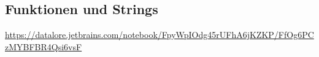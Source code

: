 \documentclass[]{scrartcl}
\begin{document}
\subsection*{Funktionen und Strings}
\url{https://datalore.jetbrains.com/notebook/FpyWpIOdg45rUFhA6jKZKP/FfOg6PCzMYBFBR4Qsi6vsF}
%
%
%
%
%
%
%
%
%
%
%
%
%
\end{document}
